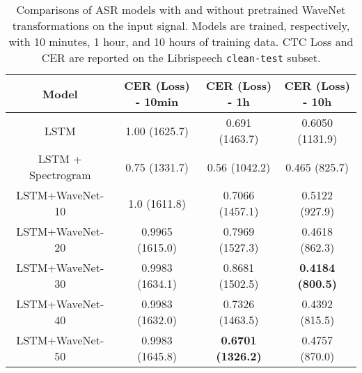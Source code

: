 \begin{table}[tb]
    \centering
    \begin{tabular}{c||c|c|c}
         Model & CER (Loss) - 10min & CER (Loss) - 1h & CER (Loss) - 10h \\
         \hline\hline
         LSTM & 1.00 (1625.7) & 0.691  (1463.7) & 0.6050 (1131.9)  \\ %
         LSTM + Spectrogram & 0.75 (1331.7) & 0.56 (1042.2) & 0.465 (825.7) \\ %
         \hline
         LSTM+WaveNet-10 & 1.0    (1611.8) & 0.7066 (1457.1) & 0.5122 (927.9) \\
         LSTM+WaveNet-20 & 0.9965 (1615.0) & 0.7969 (1527.3) & 0.4618 (862.3) \\
         LSTM+WaveNet-30 & 0.9983 (1634.1) & 0.8681 (1502.5) & \textbf{0.4184 (800.5)} \\
         LSTM+WaveNet-40 & 0.9983 (1632.0) & 0.7326 (1463.5) & 0.4392
 (815.5) \\
         LSTM+WaveNet-50 & 0.9983 (1645.8) & \textbf{0.6701 (1326.2)} & 0.4757 (870.0)\\
    \end{tabular}
        \caption{Comparisons of ASR models with and without pretrained WaveNet transformations on the input signal.
        Models are trained, respectively, with 10 minutes, 1 hour, and 10 hours of training data. 
        CTC Loss and CER are reported on the Librispeech \texttt{clean-test} subset.
        }
        \label{tab:wavenet_asr_libri}
\end{table}


\iffalse
\subsection{Testing WaveNet's capabilities at protein sequence modelling.}\label{ssec:proteins}
Following the methodology of the Debbie Marks' lab, we probed whether our implementation of WaveNet is suitable for modelling protein sequences. \cite{shin_protein_2021}
We trained WaveNets similar to the ones presented in \cref{ssec:results-lm}

\textit{[Results still pending]}
\fi

    
